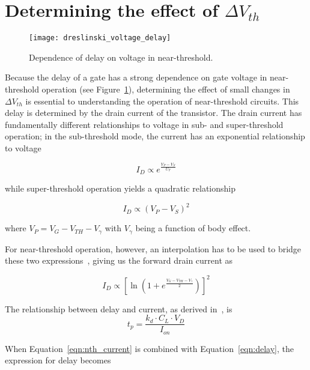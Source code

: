 \section{Determining the effect of $\Delta V_{th}$}
\label{sec:deltavth}

\begin{figure}[thpb]
    \centering
    \texttt{[image: dreslinski\_voltage\_delay]}
    \caption{Dependence of delay on voltage in near-threshold.~\cite{Dreslinski:2010ez}}
    \label{fig:voltage_delay}
\end{figure}
Because the delay of a gate has a strong dependence on gate voltage in near-threshold operation (see Figure~\ref{fig:voltage_delay}), determining the effect of small changes in $\Delta V_{th}$ is essential to understanding the operation of near-threshold circuits.
This delay is determined by the drain current of the transistor.
The drain current has fundamentally different relationships to voltage in sub- and super-threshold operation; in the sub-threshold mode, the current has an exponential relationship to voltage~\cite{Enz:1995vs} 

\begin{equation}
I_D \propto e^\frac{V_P-V_S}{U_T}
\end{equation}

while super-threshold operation yields a quadratic relationship

\begin{equation}
I_D \propto (V_P-V_S)^2
\end{equation}

where $V_P=V_G-V_{TH}-V_\gamma$ with $V_\gamma$ being a function of body effect.

For near-threshold operation, however, an interpolation has to be used to bridge these two expressions~\cite{Enz:1995vs}, giving us the forward drain current as

\begin{equation}
\label{eqn:nth_current}
I_D \propto \left[\ln\left(1+e^\frac{V_G-V_{TH}-V_\gamma}{2}\right)\right]^2
\end{equation}

The relationship between delay and current, as derived in~\cite{Hanson:2007uu}, is
\begin{equation}
\label{eqn:delay}
t_p = \frac{k_d\cdot C_L\cdot V_D}{I_{on}}
\end{equation}

When Equation~\ref{eqn:nth_current} is combined with Equation~\ref{eqn:delay}, the expression for delay becomes

